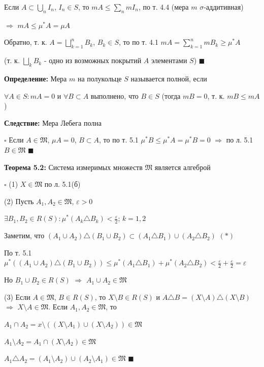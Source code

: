 \documentclass[a4paper]{report}
\begin{document}
Если $A\subset\bigcup\limits_n I_n$, $I_n\in S$, то $mA\le\sum\limits_n mI_n$, по т. 4.4 (мера $m$ $\sigma$-аддитивная)

$\Rightarrow$ $mA\le\mu^*A=\mu A$

Обратно, т. к. $A=\bigsqcup\limits_{k=1}^n B_k$, $B_k\in S$, то по т. 4.1 $mA=\sum\limits_{k=1}^n mB_k\ge\mu^*A$ 

(т. к. $\bigsqcup\limits_k B_k$ - одно из возможных покрытий $A$ элементами $S$) $\blacksquare$
\bigskip

\noindent\textbf{Определение:} Мера $m$ на полукольце $S$ называется полной, если 

$\forall A\in S\colon mA=0$ и 
$\forall B\subset A$ выполнено, что $B\in S$ (тогда $mB=0$, т. к. $mB\le mA$)
\bigskip

\noindent\textbf{Следствие:} Мера Лебега полна

\noindent $\square$ Если $A\in\mathfrak M$, $\mu A=0$, $B\subset A$, то по т. 5.1 $\mu^*B\le\mu^*A=\mu^*B=0$ $\Rightarrow$
по л. 5.1 $B\in\mathfrak M$ $\blacksquare$
 \bigskip
 
 \noindent\textbf{Теорема 5.2:} Система измеримых множеств $\mathfrak M$ является алгеброй
 
\noindent $\square$ (1) $X\in\mathfrak M$ по л. 5.1(б)

(2) Пусть $A_1,A_2\in\mathfrak M$, $\varepsilon>0$

$\exists B_1,B_2\in R(S)\colon\mu^*(A_k\triangle B_k)<\frac\varepsilon2$; $k=1,2$

Заметим, что $(A_1\cup A_2)\triangle(B_1\cup B_2)\subset(A_1\triangle B_1)\cup(A_2\triangle B_2)$ $(*)$

По т. 5.1 $\mu^*\left((A_1\cup A_2)\triangle(B_1\cup B_2)\right)\le\mu^*(A_1\triangle B_1)+\mu^*(A_2\triangle B_2)<\frac\varepsilon2
+\frac\varepsilon2=\varepsilon$

Но $B_1\cup B_2\in R(S)$ $\Rightarrow$ $A_1\cup A_2\in\mathfrak M$

(3) Если $A\in\mathfrak M$, $B\in R(S)$, то $X\setminus B\in R(S)$ и $A\triangle B=(X\setminus A)\triangle(X\setminus B)$ 
$\Rightarrow$ $X\setminus A\in\mathfrak M$. Если $A_1,A_2\in\mathfrak M$, то

$A_1\cap A_2=x\setminus\left((X\setminus A_1)\cup(X\setminus A_2)\right)\in\mathfrak M$

$A_1\setminus A_2=A_1\cap(X\setminus A_2)\in\mathfrak M$

$A_1\triangle A_2=(A_1\setminus A_2)\cup(A_2\setminus A_1)\in\mathfrak M$ $\blacksquare$
\bigskip
\end{document}
